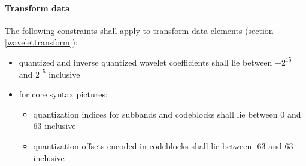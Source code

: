 \paragraph{Transform data\newline}

The following constraints shall apply to transform data elements 
(section \ref{wavelettransform}):
\begin{itemize}
\item quantized and inverse quantized wavelet coefficients shall lie 
between $-2^{15}$ and $2^{15}$ inclusive
\item for core syntax pictures:
    \begin{itemize}
    \item quantization indices for subbands and codeblocks shall lie between 
    0 and 63 inclusive 
    \item quantization offsets encoded in codeblocks shall lie between 
    -63 and 63 inclusive
    \end{itemize} 
\end{itemize} 














